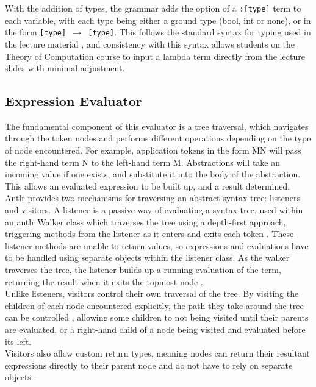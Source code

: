 \documentclass[a4paper,12pt]{report}
\begin{document}
With the addition of types, the grammar adds the option of a \texttt{:[type]} term to each variable, with each type being either a ground type (bool, int or none), or in the form \texttt{[type] $\rightarrow$ [type]}. This follows the standard syntax for typing used in the lecture material \cite{Hankin2004} \cite{Gay2019}, and consistency with this syntax allows students on the Theory of Computation course to input a lambda term directly from the lecture slides with minimal adjustment.

\subsection{Expression Evaluator}

The fundamental component of this evaluator is a tree traversal, which navigates through the token nodes and performs different operations depending on the type of node encountered. For example, application tokens in the form MN will pass the right-hand term N to the left-hand term M. Abstractions will take an incoming value if one exists, and substitute it into the body of the abstraction. This allows an evaluated expression to be built up, and a result determined.\\

Antlr provides two mechanisms for traversing an abstract syntax tree: listeners and visitors. A listener is a passive way of evaluating a syntax tree, used within an antlr Walker class which traverses the tree using a depth-first approach, triggering methods from the listener as it enters and exits each token \cite{Parr2012}. These listener methods are unable to return values, so expressions and evaluations have to be handled using separate objects within the listener class. As the walker traverses the tree, the listener builds up a running evaluation of the term, returning the result when it exits the topmost node \cite{Srivastav2017}.\\

Unlike listeners, visitors control their own traversal of the tree. By visiting the children of each node encountered explicitly, the path they take around the tree can be controlled \cite{Parr2012}, allowing some children to not being visited until their parents are evaluated, or a right-hand child of a node being visited and evaluated before its left.\\

Visitors also allow custom return types, meaning nodes can return their resultant expressions directly to their parent node and do not have to rely on separate objects \cite{Srivastav2017}.\\
\end{document}
